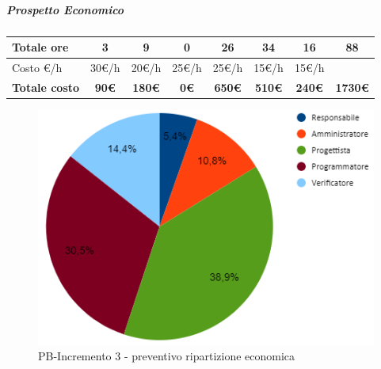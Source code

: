 \subparagraph{Prospetto Economico}
\begin{center}
	\renewcommand{\arraystretch}{1.8} %
	\begin{tabular}{ |m{10em}|c|c|c|c|c|c|c| }
	\hline
    Totale ore & 3 & 9 & 0 & 26 & 34 & 16 & \textbf{88}\\
    \hline
    Costo \euro/h & 30\euro/h & 20\euro/h & 25\euro/h & 25\euro/h & 15\euro/h & 15\euro/h & \\
    \hline
    \textbf{Totale costo} & \textbf{90\euro} & \textbf{180\euro} &  \textbf{0\euro} &  \textbf{650\euro} &  \textbf{510\euro} &  \textbf{240\euro} &  \textbf{1730\euro}\\
    \hline
	\end{tabular}

    \begin{figure}[H]
       \centering\includegraphics{images/preventivo/PB-incremento3-costo.png}
       \caption{PB-Incremento 3 - preventivo ripartizione economica}
    \end{figure}
\end{center}



